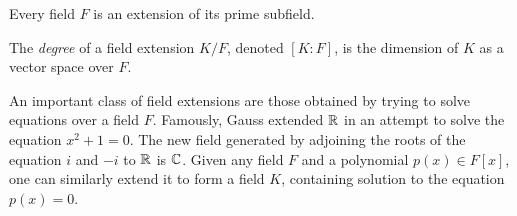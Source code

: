 \begin{remark}
  Every field $F$ is an extension of its prime subfield.
\end{remark}

\begin{definition}
  The \textit{degree} of a field extension $K/F$, denoted $[K:F]$, is the dimension of $K$ as a
  vector space over $F$. \cite{dummit}
\end{definition}

An important class of field extensions are those obtained by trying to solve equations over
a field $F$. Famously, Gauss extended $\mathbb{R}$ in an attempt to solve the equation $x^2+1=0$.
The new field generated by adjoining the roots of the equation $i$ and $-i$ to $\mathbb{R}$ is $\mathbb{C}$.
Given any field $F$ and a polynomial $p(x)\in F[x]$, one can similarly extend it to form a field
$K$, containing solution to the equation $p(x)=0$.
